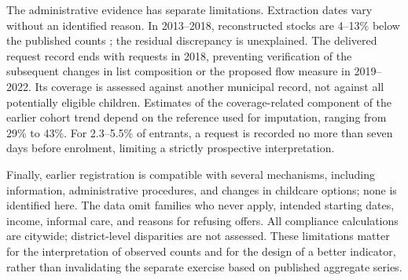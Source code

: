 The administrative evidence has separate limitations. Extraction dates vary without an identified reason. In 2013--2018, reconstructed stocks are 4--13\% below the published counts \citep{sme_demanda_escolar}; the residual discrepancy is unexplained. The delivered request record ends with requests in 2018, preventing verification of the subsequent changes in list composition or the proposed flow measure in 2019--2022. Its coverage is assessed against another municipal record, not against all potentially eligible children. Estimates of the coverage-related component of the earlier cohort trend depend on the reference used for imputation, ranging from 29\% to 43\%. For 2.3--5.5\% of entrants, a request is recorded no more than seven days before enrolment, limiting a strictly prospective interpretation.

Finally, earlier registration is compatible with several mechanisms, including information, administrative procedures, and changes in childcare options; none is identified here. The data omit families who never apply, intended starting dates, income, informal care, and reasons for refusing offers. All compliance calculations are citywide; district-level disparities are not assessed. These limitations matter for the interpretation of observed counts and for the design of a better indicator, rather than invalidating the separate exercise based on published aggregate series.
